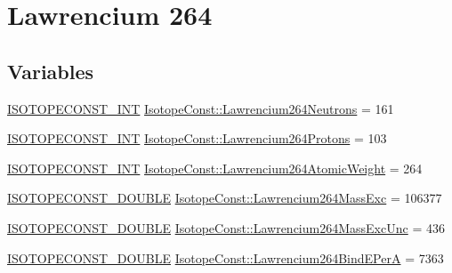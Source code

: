 \hypertarget{group___isotope_const-_lawrencium-_lr264}{}\section{Lawrencium 264}
\label{group___isotope_const-_lawrencium-_lr264}
\subsection*{Variables}
\begin{DoxyCompactItemize}
\item 
\mbox{\hyperlink{group___isotope_const-_macros_ga5f18360b3e99483a35c32d789e62621c}{I\+S\+O\+T\+O\+P\+E\+C\+O\+N\+S\+T\+\_\+\+I\+NT}} \mbox{\hyperlink{group___isotope_const-_lawrencium-_lr264_ga4bfdcbfb3cd317eedfb733afcad989fa}{Isotope\+Const\+::\+Lawrencium264\+Neutrons}} = 161
\item 
\mbox{\hyperlink{group___isotope_const-_macros_ga5f18360b3e99483a35c32d789e62621c}{I\+S\+O\+T\+O\+P\+E\+C\+O\+N\+S\+T\+\_\+\+I\+NT}} \mbox{\hyperlink{group___isotope_const-_lawrencium-_lr264_gade40ccfe2eb1496b27e4e0b6014d2dc7}{Isotope\+Const\+::\+Lawrencium264\+Protons}} = 103
\item 
\mbox{\hyperlink{group___isotope_const-_macros_ga5f18360b3e99483a35c32d789e62621c}{I\+S\+O\+T\+O\+P\+E\+C\+O\+N\+S\+T\+\_\+\+I\+NT}} \mbox{\hyperlink{group___isotope_const-_lawrencium-_lr264_gacdbd7c54b98ea7c0be717031abecde0b}{Isotope\+Const\+::\+Lawrencium264\+Atomic\+Weight}} = 264
\item 
\mbox{\hyperlink{group___isotope_const-_macros_ga8f45a7272ce02c0b4c65c44636ed719a}{I\+S\+O\+T\+O\+P\+E\+C\+O\+N\+S\+T\+\_\+\+D\+O\+U\+B\+LE}} \mbox{\hyperlink{group___isotope_const-_lawrencium-_lr264_ga54bba16ba8b6a2167973610620d504fb}{Isotope\+Const\+::\+Lawrencium264\+Mass\+Exc}} = 106377
\item 
\mbox{\hyperlink{group___isotope_const-_macros_ga8f45a7272ce02c0b4c65c44636ed719a}{I\+S\+O\+T\+O\+P\+E\+C\+O\+N\+S\+T\+\_\+\+D\+O\+U\+B\+LE}} \mbox{\hyperlink{group___isotope_const-_lawrencium-_lr264_ga682bee7700df06f5f0bea6264039bb26}{Isotope\+Const\+::\+Lawrencium264\+Mass\+Exc\+Unc}} = 436
\item 
\mbox{\hyperlink{group___isotope_const-_macros_ga8f45a7272ce02c0b4c65c44636ed719a}{I\+S\+O\+T\+O\+P\+E\+C\+O\+N\+S\+T\+\_\+\+D\+O\+U\+B\+LE}} \mbox{\hyperlink{group___isotope_const-_lawrencium-_lr264_gab7877892c9944cd08f1da3cc416924de}{Isotope\+Const\+::\+Lawrencium264\+Bind\+E\+PerA}} = 7363
\item 

\end{DoxyCompactItemize}

